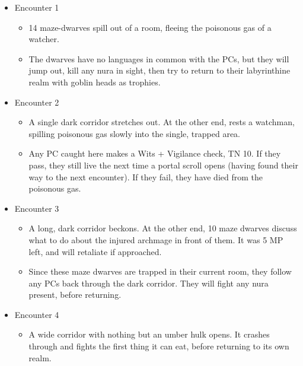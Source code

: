 \begin{multicols}{2}
\begin{itemize}

	\item{Encounter 1}
	\begin{itemize}
		\item{14 maze-dwarves spill out of a room, fleeing the poisonous gas of a watcher.}
		\item{The dwarves have no languages in common with the PCs, but they will jump out, kill any nura in sight, then try to return to their labyrinthine realm with goblin heads as trophies.}
	\end{itemize}
	\item{Encounter 2}
	\begin{itemize}
		\item{A single dark corridor stretches out.  At the other end, rests a watchman, spilling poisonous gas slowly into the single, trapped area.}
		\item{Any PC caught here makes a Wits + Vigilance check, TN 10. If they pass, they still live the next time a portal scroll opens (having found their way to the next encounter). If they fail, they have died from the poisonous gas.}
	\end{itemize}
	\item{Encounter 3}
	\begin{itemize}
		\item{A long, dark corridor beckons. At the other end, 10 maze dwarves discuss what to do about the injured archmage in front of them. It was 5 MP left, and will retaliate if approached.}
		\item{Since these maze dwarves are trapped in their current room, they follow any PCs back through the dark corridor.  They will fight any nura present, before returning.}
	\end{itemize}
	\item{Encounter 4}
	\begin{itemize}
		\item{A wide corridor with nothing but an umber hulk opens. It crashes through and fights the first thing it can eat, before returning to its own realm.}
	\end{itemize}
\end{itemize}


\umberhulk

\end{multicols}

